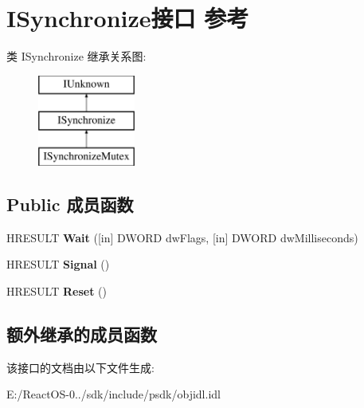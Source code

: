 \hypertarget{interface_i_synchronize}{}\section{I\+Synchronize接口 参考}
\label{interface_i_synchronize}
类 I\+Synchronize 继承关系图\+:\begin{figure}[H]
\begin{center}
\leavevmode
\includegraphics[height=3.000000cm]{interface_i_synchronize}
\end{center}
\end{figure}
\subsection*{Public 成员函数}
\begin{DoxyCompactItemize}
\item 
\mbox{\label{interface_i_synchronize_ae6c9e2380439cdff2d7435bbe1145379}} 
H\+R\+E\+S\+U\+LT {\bfseries Wait} (\mbox{[}in\mbox{]} D\+W\+O\+RD dw\+Flags, \mbox{[}in\mbox{]} D\+W\+O\+RD dw\+Milliseconds)
\item 
\mbox{\label{interface_i_synchronize_a6937888239dcbbe9469aaefc2725cb2e}} 
H\+R\+E\+S\+U\+LT {\bfseries Signal} ()
\item 
\mbox{\label{interface_i_synchronize_a8b9968309bb6b9250dcf17c0f209f7fd}} 
H\+R\+E\+S\+U\+LT {\bfseries Reset} ()
\end{DoxyCompactItemize}
\subsection*{额外继承的成员函数}


该接口的文档由以下文件生成\+:\begin{DoxyCompactItemize}
\item 
E\+:/\+React\+O\+S-\/0../sdk/include/psdk/objidl.\+idl\end{DoxyCompactItemize}
